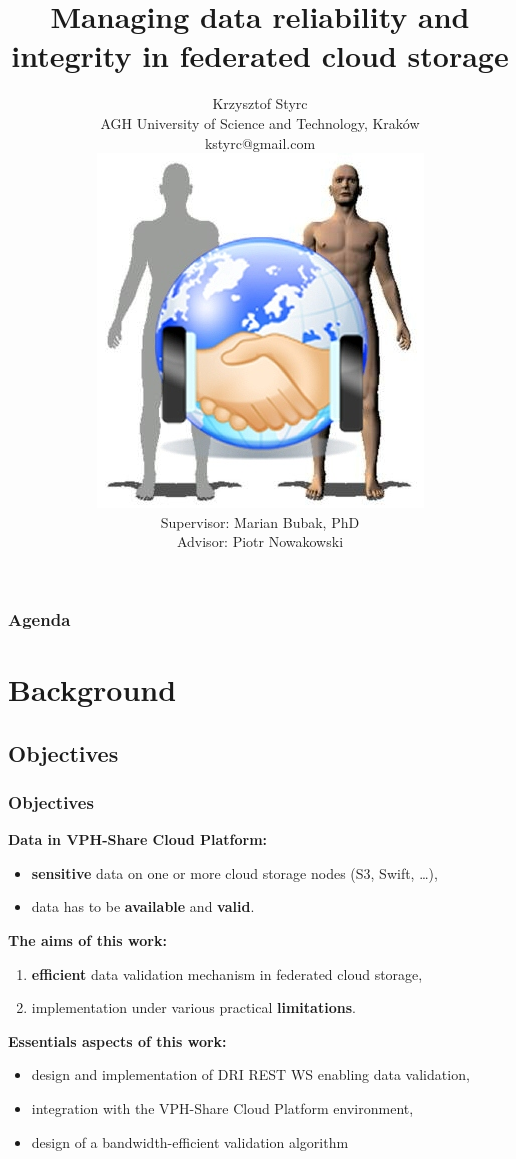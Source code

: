 \documentclass[compress]{beamer}
\title[Data reliability and integrity in federated cloud storage]{\textbf{Managing data reliability and integrity in federated cloud storage}}
\author[Krzysztof Styrc AGH]{
Krzysztof Styrc\\
\vspace{0.2cm}
\tiny
AGH University of Science and Technology, Kraków\\
\noindent
kstyrc@gmail.com\\
\vspace{0.5cm}
\includegraphics[height=0.2\textheight]{img/vph-share.jpg}\\
\vspace{0.5cm}
\normalsize
\hspace{5.4cm}
Supervisor: Marian Bubak, PhD\\
\hspace{4.5cm}
Advisor: Piotr Nowakowski\\
}
\date{}
\begin{document}
\frame{\titlepage}

\begin{frame}
\frametitle{\textbf{Agenda}}
	\footnotesize
	\tableofcontents
\end{frame}

\section{Background}

\subsection{Objectives}
\begin{frame}
\frametitle{Objectives}
\begin{block}{\textbf{Data in VPH-Share Cloud Platform:}}
\begin{itemize}
	\item \textbf{sensitive} data on one or more cloud storage nodes (S3, Swift, \ldots),
	\item data has to be \textbf{available} and \textbf{valid}.
\end{itemize}
\end{block}
\begin{exampleblock}{\textbf{The aims of this work:}}
	\begin{enumerate}
		\item \textbf{efficient} data validation mechanism in federated cloud storage,
		\item implementation under various practical \textbf{limitations}.
	\end{enumerate}
\end{exampleblock}
\begin{block}{\textbf{Essentials aspects of this work:}}
\begin{itemize}
	\item design and implementation of DRI REST WS enabling data validation,
	\item integration with the VPH-Share Cloud Platform environment,
	\item design of a bandwidth-efficient validation algorithm
\end{itemize}
\end{block}
\end{frame}
\end{document}
